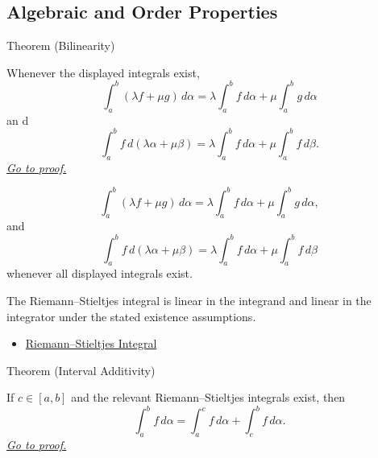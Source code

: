 \subsection*{Algebraic and Order Properties}

\begin{theorembox}{Theorem (Bilinearity)}
\begin{theorem}
\label{thm:rs-bilinearity}
Whenever the displayed integrals exist,
\[
  \int_a^b (\lambda f+\mu g)\,d\alpha
  =
  \lambda\int_a^b f\,d\alpha+\mu\int_a^b g\,d\alpha
\]
an
d
\[
  \int_a^b f\,d(\lambda\alpha+\mu\beta)
  =
  \lambda\int_a^b f\,d\alpha+\mu\int_a^b f\,d\beta .
\]
\hyperref[prf:rs-bilinearity]{\textit{Go to proof.}}
\end{theorem}
\end{theorembox}

\begin{remark*}
\[
\int_a^b (\lambda f+\mu g)\,d\alpha
=
\lambda\int_a^b f\,d\alpha+\mu\int_a^b g\,d\alpha,
\]
and
\[
\int_a^b f\,d(\lambda\alpha+\mu\beta)
=
\lambda\int_a^b f\,d\alpha+\mu\int_a^b f\,d\beta
\]
whenever all displayed integrals exist.
\end{remark*}

\begin{remark*}[Interpretation]
The Riemann--Stieltjes integral is linear in the integrand and linear in the
integrator under the stated existence assumptions.
\end{remark*}

\begin{dependencies}
\begin{itemize}
  \item \hyperref[def:riemann-stieltjes-integral]{Riemann--Stieltjes Integral}
\end{itemize}
\end{dependencies}

\begin{theorembox}{Theorem (Interval Additivity)}
\begin{theorem}
\label{thm:rs-interval-additivity}
If \(c\in[a,b]\) and the relevant Riemann--Stieltjes integrals exist, then
\[
  \int_a^b f\,d\alpha
  =
  \int_a^c f\,d\alpha+\int_c^b f\,d\alpha .
\]
\hyperref[prf:rs-interval-additivity]{\textit{Go to proof.}}
\end{theorem}
\end{theorembox}


